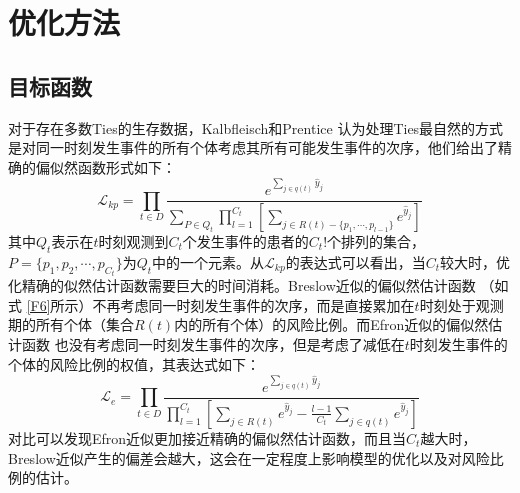 \section{优化方法}

\subsection{目标函数}

对于存在多数Ties的生存数据，Kalbfleisch和Prentice  认为处理Ties最自然的方式是对同一时刻发生事件的所有个体考虑其所有可能发生事件的次序，他们给出了精确的偏似然函数形式如下：
\begin{equation}
\mathcal{L}_{kp} = \prod_{t\in D} \frac{e^{\sum_{j\in q(t)} \hat{y}_j}}{\sum_{P\in Q_t} \prod_{l=1}^{C_t} [\sum_{j \in R(t)-\{p_1,\cdots ,p_{l-1}\}} e^{\hat{y}_j}]}
\end{equation}
其中$Q_t$表示在$t$时刻观测到$C_t$个发生事件的患者的$C_t!$个排列的集合，$P=\{p_1,p_2,\cdots ,p_{C_t}\}$为$Q_t$中的一个元素。从$\mathcal{L}_{kp}$的表达式可以看出，当$C_t$较大时，优化精确的似然估计函数需要巨大的时间消耗。Breslow近似的偏似然估计函数 （如式 \eqref{F6}所示）不再考虑同一时刻发生事件的次序，而是直接累加在$t$时刻处于观测期的所有个体（集合$R(t)$内的所有个体）的风险比例。而Efron近似的偏似然估计函数 也没有考虑同一时刻发生事件的次序，但是考虑了减低在$t$时刻发生事件的个体的风险比例的权值，其表达式如下：
\begin{equation}
\mathcal{L}_{e} = \prod_{t\in D} \frac{e^{\sum_{j\in q(t)} \hat{y}_j}}{\prod_{l=1}^{C_t} \left[\sum_{j \in R(t)} e^{\hat{y}_j} - \frac{l-1}{C_t} \sum_{j \in q(t)} e^{\hat{y}_j} \right]}
\end{equation}
对比可以发现Efron近似更加接近精确的偏似然估计函数，而且当$C_t$越大时，Breslow近似产生的偏差会越大，这会在一定程度上影响模型的优化以及对风险比例的估计。

